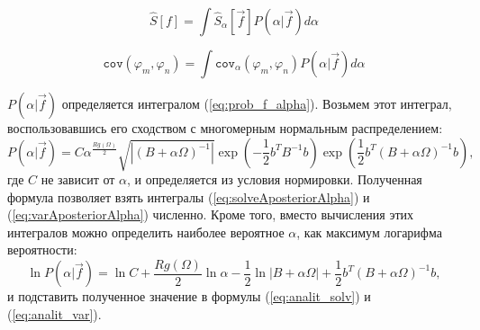 \begin{equation}
\label{eq:solveAposteriorAlpha}
\hat{S}[f] = \int \hat{S}_{\alpha}[\vec{f}] P(\alpha|\vec{f}) d \alpha
\end{equation}

\begin{equation}
\label{eq:varAposteriorAlpha}
\texttt{cov}(\varphi_m, \varphi_n) = \int \texttt{cov}_{\alpha}(\varphi_m, \varphi_n) P(\alpha|\vec{f}) d \alpha
\end{equation}

$P(\alpha|\vec{f})$ определяется интегралом (\ref{eq:prob_f_alpha}). Возьмем этот интеграл, воспользовавшись его сходством с многомерным нормальным распределением:
\begin{equation}
\label{eq:alphaaposter}
P(\alpha|\vec{f}) = C \alpha^{\frac{Rg(\Omega)}{2}}\sqrt{|(B+\alpha\Omega)^{-1}|}\exp(-\frac{1}{2}b^{T}B^{-1}b)\exp(\frac{1}{2}b^{T}(B+\alpha\Omega)^{-1}b),
\end{equation}
где $C$ не зависит от $\alpha$, и определяется из условия нормировки. Полученная формула позволяет взять интегралы (\ref{eq:solveAposteriorAlpha}) и (\ref{eq:varAposteriorAlpha}) численно.
Кроме того, вместо вычисления этих интегралов можно определить наиболее вероятное $\alpha$, как максимум логарифма вероятности:
\begin{equation}
\ln{P(\alpha|\vec{f})} = \ln{C} + \frac{Rg(\Omega)}{2}\ln{\alpha} - \frac{1}{2}\ln{|B+\alpha\Omega|}  + \frac{1}{2}b^{T}(B+\alpha\Omega)^{-1}b,
\end{equation}
и подставить полученное значение в формулы (\ref{eq:analit_solv}) и (\ref{eq:analit_var}).

